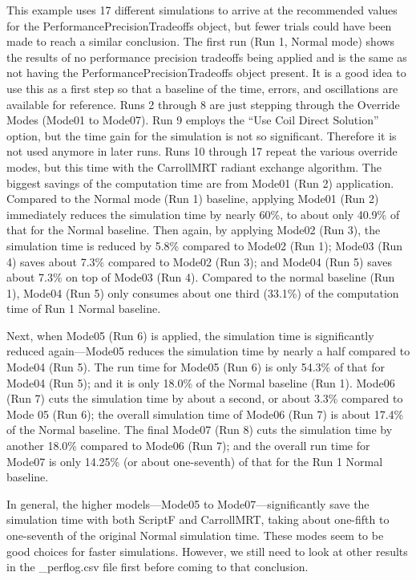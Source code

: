 This example uses 17 different simulations to arrive at the recommended values for the PerformancePrecisionTradeoffs object, but fewer trials could have been made to reach a similar conclusion. The first run (Run 1, Normal mode) shows the results of no performance precision tradeoffs being applied and is the same as not having the PerformancePrecisionTradeoffs object present. It is a good idea to use this as a first step so that a baseline of the time, errors, and oscillations are available for reference.  Runs 2 through 8 are just stepping through the Override Modes (Mode01 to Mode07). Run 9 employs the ``Use Coil Direct Solution'' option, but the time gain for the simulation is not so significant. Therefore it is not used anymore in later runs. Runs 10 through 17 repeat the various override modes, but this time with the CarrollMRT radiant exchange algorithm. The biggest savings of the computation time are from Mode01 (Run 2) application. Compared to the Normal mode (Run 1) baseline, applying Mode01 (Run 2) immediately reduces the simulation time by nearly 60\%, to about only 40.9\% of that for the Normal baseline. Then again, by applying Mode02 (Run 3), the simulation time is reduced by 5.8\% compared to Mode02 (Run 1); Mode03 (Run 4) saves about 7.3\% compared to Mode02 (Run 3); and Mode04 (Run 5) saves about 7.3\% on top of Mode03 (Run 4). Compared to the normal baseline (Run 1), Mode04 (Run 5) only consumes about one third (33.1\%) of the computation time of Run 1 Normal baseline.

Next, when Mode05 (Run 6) is applied, the simulation time is significantly reduced again---Mode05 reduces the simulation time by nearly a half compared to Mode04 (Run 5). The run time for Mode05 (Run 6) is only 54.3\% of that for Mode04 (Run 5); and it is only 18.0\% of the Normal baseline (Run 1). Mode06 (Run 7) cuts the simulation time by about a second, or about 3.3\% compared to Mode 05 (Run 6); the overall simulation time of Mode06 (Run 7) is about 17.4\% of the Normal baseline. The final Mode07 (Run 8) cuts the simulation time by another 18.0\% compared to Mode06 (Run 7); and the overall run time for Mode07 is only 14.25\% (or about one-seventh) of that for the Run 1 Normal baseline.

In general, the higher models---Mode05 to Mode07---significantly save the simulation time with both ScriptF and CarrollMRT, taking about one-fifth to one-seventh of the original Normal simulation time. These modes seem to be good choices for faster simulations. However, we still need to look at other results in the \_perflog.csv file first before coming to that conclusion.

